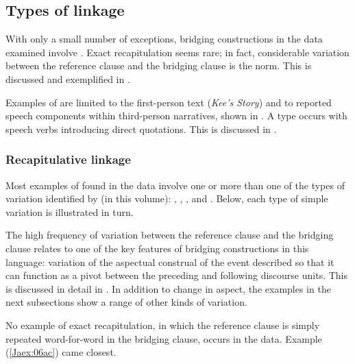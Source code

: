 \documentclass[output=paper]{LSP/langsci}
\begin{document}
\subsection{Types of linkage}
\label{Jatypes}
With only a small number of exceptions, bridging constructions in the  data examined involve . Exact recapitulation seems rare; in fact, considerable variation between the reference clause and the bridging clause is the norm. This is discussed and exemplified in . 
 
Examples of  are limited to the first-person text (\textit{Kee’s Story}) and to reported speech components within third-person narratives, shown in . A  type occurs with speech verbs introducing direct quotations. This is discussed in .
 
\subsubsection{Recapitulative linkage}
\label{JaRecapitulative}
Most examples of  found in the data involve one or more than one of the types of variation identified by \citeauthor{guerin18} (in this volume): , , , and . Below, each type of simple variation is illustrated in turn.
 
The high frequency of variation between the reference clause and the bridging clause relates to one of the key features of bridging constructions in this language: variation of the aspectual construal of the event described so that it can function as a pivot between the preceding and following discourse units. This is discussed in detail in . In addition to change in aspect, the examples in the next subsections show a range of other kinds of variation.
 

No example of exact recapitulation, in which the reference clause is simply repeated word-for-word in the bridging clause, occurs in the data. Example (\ref{Jaex:06ac}) came closest.
\end{document}

